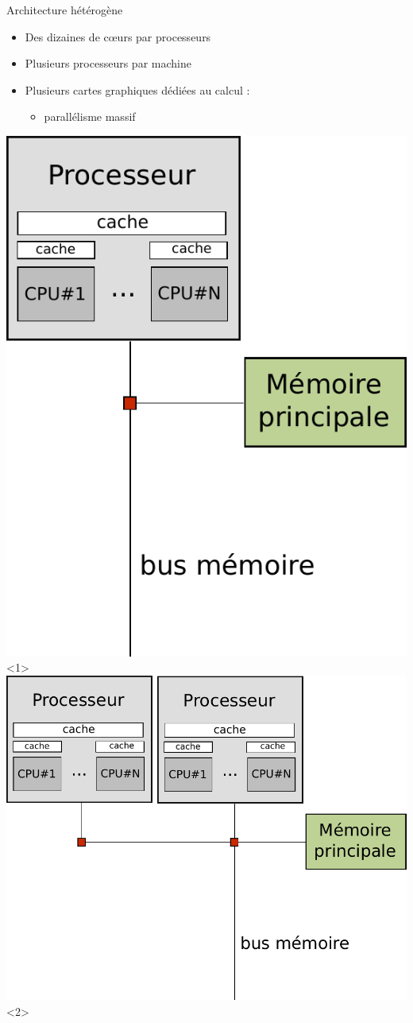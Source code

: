 \documentclass[9pt]{beamer}
\begin{document}
\begin{frame}{Architecture hétérogène}
  \vfill
  \begin{minipage}{0.45\textwidth}
    \begin{itemize}
    \item<1-> Des dizaines de cœurs par processeurs
      \vfill
    \item<2-> Plusieurs processeurs par machine
      \vfill
    \item<3-> Plusieurs cartes graphiques dédiées au calcul :
      \begin{itemize}
      \item parallélisme massif
      \end{itemize}
    \end{itemize}
    \vfill
  \end{minipage} \hfill
  \begin{minipage}{0.50\textwidth}
    \centering
    \includegraphics[width=0.7\linewidth]{img/arch-1.pdf}<1>
    \includegraphics[width=1\linewidth]{img/arch-2.pdf}<2>

\end{minipage}
\end{frame}
\end{document}
